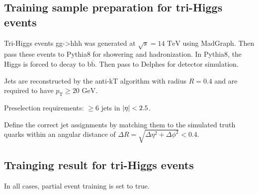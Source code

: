 \documentclass[12pt]{article}
\begin{document}
	\subsection{Training sample preparation for tri-Higgs events}%
	\label{sub:training_sample_preparation_for_tri_higgs_events}
		Tri-Higgs events gg->hhh was generated at $\sqrt{s} = \text{14 TeV}$ using MadGraph. Then pass these events to Pythia8 for showering and hadronization. In Pythia8, the Higgs is forced to decay to b$\overline{\text{b}}$. Then pass to Delphes for detector simulation.
	
		Jets are reconstructed by the anti-kT algorithm with radius $R=0.4$ and are required to have $p_\text{T}\ge \text{20 GeV}$.

		Preselection requirements: $\ge 6$ jets in  $\abs{\eta}<2.5$.

		Define the correct jet assignments by matching them to the simulated truth quarks within an angular distance of $\Delta R = \sqrt{\Delta\eta^2 + \Delta\phi^2}<0.4$.
	\subsection{Trainging result for tri-Higgs events}%
	\label{sub:trainging_result_for_tri_higgs_events}
		In all cases, partial event training is set to true.
\end{document}
